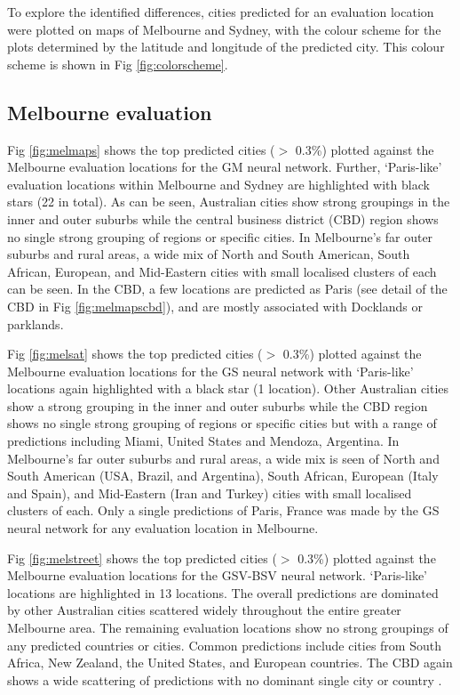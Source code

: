 \documentclass[10pt,letterpaper]{article}
\begin{document}
To explore the identified differences, cities predicted for an evaluation location were plotted on maps of Melbourne and Sydney, with the colour scheme for the plots determined by the latitude and longitude of the predicted city. This colour scheme is shown in Fig \ref{fig:colorscheme}. 


\subsection*{Melbourne evaluation} 

Fig \ref{fig:melmaps} shows the top predicted cities ($>$ 0.3\%) plotted against the Melbourne evaluation locations for the GM neural network. Further, `Paris-like' evaluation locations within Melbourne and Sydney are highlighted with black stars (22 in total). As can be seen, Australian cities show strong groupings in the inner and outer suburbs while the central business district (CBD) region shows no single strong grouping of regions or specific cities. In Melbourne's far outer suburbs and rural areas, a wide mix of North and South American, South African, European, and Mid-Eastern cities with small localised clusters of each can be seen. In the CBD, a few locations are predicted as Paris (see detail of the CBD in Fig \ref{fig:melmapscbd}), and are mostly associated with Docklands or parklands.

Fig \ref{fig:melsat} shows the top predicted cities ($>$ 0.3\%) plotted against the Melbourne evaluation locations for the GS neural network with `Paris-like' locations again highlighted with a black star (1 location). Other Australian cities show a strong grouping in the inner and outer suburbs while the CBD region shows no single strong grouping of regions or specific cities but with a range of predictions including Miami, United States and Mendoza, Argentina. In Melbourne's far outer suburbs and rural areas, a wide mix is seen of North and South American (USA, Brazil, and Argentina), South African, European (Italy and Spain), and Mid-Eastern (Iran and Turkey) cities with small localised clusters of each. Only a single predictions of Paris, France was made by the GS neural network for any evaluation location in Melbourne.

Fig \ref{fig:melstreet} shows the top predicted cities ($>$ 0.3\%) plotted against the Melbourne evaluation locations for the GSV-BSV neural network. `Paris-like' locations are highlighted in 13 locations. The overall predictions are dominated by other Australian cities scattered widely throughout the entire greater Melbourne area. The remaining evaluation locations show no strong groupings of any predicted countries or cities. Common predictions include cities from South Africa, New Zealand, the United States, and European countries. The CBD again shows a wide scattering of predictions with no dominant single city or country .
\end{document}
